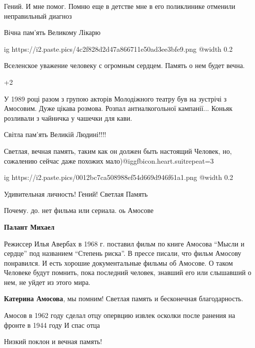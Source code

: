\begin{itemize}
Гений. И мне помог. Помню еще в детстве мне в его поликлинике отменили
неправильный диагноз


Вічна пам'ять Великому Лікарю

\ifcmt
  ig https://i2.paste.pics/4c2f828d2d47a866711e50ad3ee3bfe9.png
  @width 0.2
\fi

Вселенское уважение человеку с огромным сердцем. Память о нем будет вечна.


+2

У 1989 році разом з групою акторів Молодіжного театру був на зустрічі з
Амосовим. Дуже цікава розмова.  Розпал антиалкогольної кампанії... Коньяк
розливали з чайничка у чашечки для кави.


Світла пам'ять Великій Людині!!!!


Светлая, вечная память, таким как он должен быть настоящий Человек, но,
сожалению сейчас даже похожих мало)@igg{fbicon.heart.suit}{repeat=3}


\ifcmt
  ig https://i2.paste.pics/0012bc7ca508988ef54d669d946f61a1.png
  @width 0.2
\fi

Удивительная личность! Гений! Светлая Память

Почему. до. нет фильма или сериала. оь Амосове

\begin{itemize} %
\textbf{Палант Михаел} 

Режиссер Илья Авербах в 1968 г. поставил фильм по книге Амосова \enquote{Мысли и
сердце} под названием \enquote{Степень риска}. В прессе писали, что фильм Амосову
понравился. И есть хорошие документальные фильмы об Амосове. О таком Человеке
будут помнить, пока последний человек, знавший его или слышавший о нем, не
уйдет из этого мира.

\end{itemize} %

\textbf{Катерина Амосова}, мы помним! Светлая память и бесконечная благодарность.

Амосов в 1962 году сделал отцу опервцию извлек осколки после ранения на фронте в 1944 году
И спас отца

Низкий поклон и вечная память!


\end{itemize}
